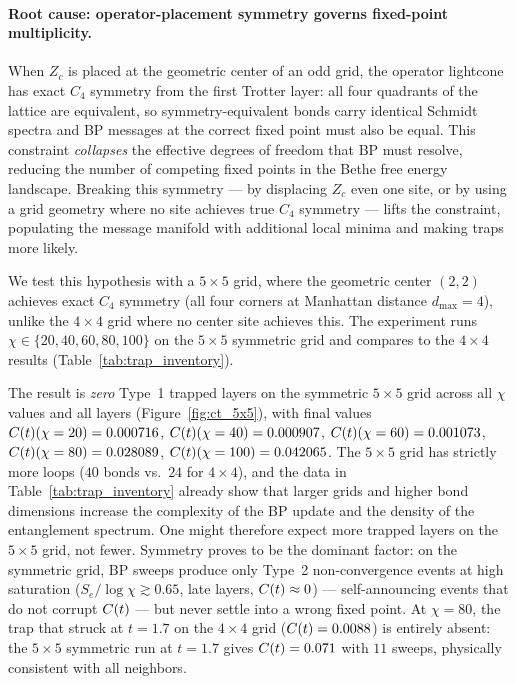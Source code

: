 \paragraph{Root cause: operator-placement symmetry governs fixed-point multiplicity.}
When $Z_c$ is placed at the geometric center of an odd grid, the operator
lightcone has exact $C_4$ symmetry from the first Trotter layer: all four
quadrants of the lattice are equivalent, so symmetry-equivalent bonds carry
identical Schmidt spectra and BP messages at the correct fixed point must also
be equal.
This constraint \emph{collapses} the effective degrees of freedom that BP must
resolve, reducing the number of competing fixed points in the Bethe free energy
landscape.
Breaking this symmetry --- by displacing $Z_c$ even one site, or by using a
grid geometry where no site achieves true $C_4$ symmetry --- lifts the
constraint, populating the message manifold with additional local minima and
making traps more likely.

We test this hypothesis with a $5\times5$ grid, where the geometric center
$(2,2)$ achieves exact $C_4$ symmetry (all four corners at Manhattan distance
$d_{\max}=4$), unlike the $4\times4$ grid where no center site achieves this.
The experiment runs $\chi \in \{20, 40, 60, 80, 100\}$ on the $5\times5$
symmetric grid and compares to the $4\times4$ results (Table~\ref{tab:trap_inventory}).

The result is \emph{zero} Type~1 trapped layers on the symmetric $5\times5$ grid
across all $\chi$ values and all layers (Figure~\ref{fig:ct_5x5}),
with final values $C(t)(\chi=20)=0.000716$, $C(t)(\chi=40)=0.000907$,
$C(t)(\chi=60)=0.001073$, $C(t)(\chi=80)=0.028089$, $C(t)(\chi=100)=0.042065$.
The $5\times5$ grid has strictly more loops ($40$ bonds vs.\ $24$ for $4\times4$),
and the data in Table~\ref{tab:trap_inventory} already show
that larger grids and higher bond dimensions increase the complexity of the BP
update and the density of the entanglement spectrum.
One might therefore expect more trapped layers on the $5\times5$ grid, not
fewer.
Symmetry proves to be the dominant factor: on the symmetric grid, BP sweeps
produce only Type~2 non-convergence events at high saturation
($S_e/\log\chi \gtrsim 0.65$, late layers, $C(t) \approx 0$) --- self-announcing
events that do not corrupt $C(t)$ --- but never settle into a wrong fixed point.
At $\chi=80$, the trap that struck at $t=1.7$ on the $4\times4$ grid
($C(t)=0.0088$) is entirely absent: the $5\times5$ symmetric run at $t=1.7$
gives $C(t)=0.071$ with $11$ sweeps, physically consistent with all neighbors.

